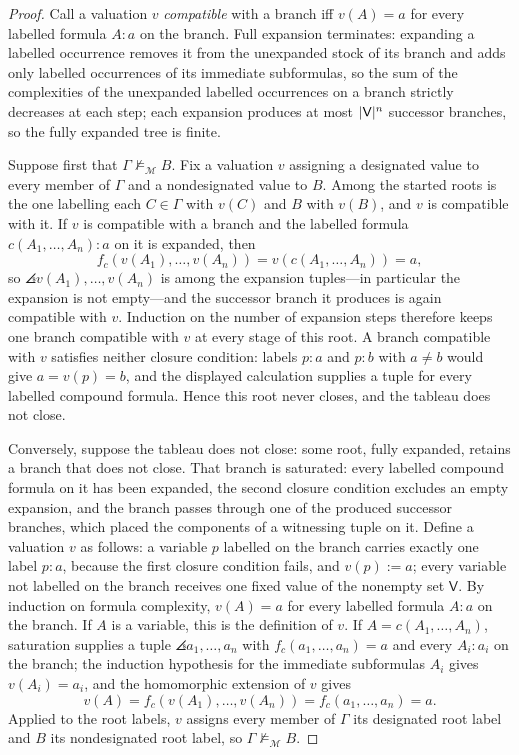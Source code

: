 \documentclass[11pt,oneside,openany]{book}
\theoremstyle{definition}
\theoremstyle{plain}
\theoremstyle{remark}
\DeclarePairedDelimiter{\angles}{\langle}{\rangle}
\DeclarePairedDelimiter{\abs}{\lvert}{\rvert}
\newcommand{\notentails}{\not\models}
\newcommand{\tuple}[1]{\angles{#1}}
\newcommand{\defeq}{\mathrel{:=}}
\begin{document}
\begin{proof}
Call a valuation \(v\) \emph{compatible} with a branch iff \(v(A)=a\) for
every labelled formula \(A{:}a\) on the branch.  Full expansion terminates:
expanding a labelled occurrence removes it from the unexpanded stock of its
branch and adds only labelled occurrences of its immediate subformulas, so
the sum of the complexities of the unexpanded labelled occurrences on a
branch strictly decreases at each step; each expansion produces at most
\(\abs{\mathsf V}^{n}\) successor branches, so the fully expanded tree is
finite.

Suppose first that \(\Gamma\notentails_{\mathcal M}B\).  Fix a valuation
\(v\) assigning a designated value to every member of \(\Gamma\) and a
nondesignated value to \(B\).  Among the started roots is the one labelling
each \(C\in\Gamma\) with \(v(C)\) and \(B\) with \(v(B)\), and \(v\) is
compatible with it.  If \(v\) is compatible with a branch and the labelled
formula \(c(A_1,\ldots,A_n){:}a\) on it is expanded, then
\[
  f_c(v(A_1),\ldots,v(A_n))=v(c(A_1,\ldots,A_n))=a,
\]
so \(\tuple{v(A_1),\ldots,v(A_n)}\) is among the expansion tuples---in
particular the expansion is not empty---and the successor branch it produces
is again compatible with \(v\).  Induction on the number of expansion steps
therefore keeps one branch compatible with \(v\) at every stage of this
root.  A branch compatible with \(v\) satisfies neither closure condition:
labels \(p{:}a\) and \(p{:}b\) with \(a\ne b\) would give \(a=v(p)=b\), and
the displayed calculation supplies a tuple for every labelled compound
formula.  Hence this root never closes, and the tableau does not close.

Conversely, suppose the tableau does not close: some root, fully expanded,
retains a branch that does not close.  That branch is saturated: every
labelled compound formula on it has been expanded, the second closure
condition excludes an empty expansion, and the branch passes through one of
the produced successor branches, which placed the components of a witnessing
tuple on it.  Define a valuation \(v\) as follows: a variable \(p\) labelled
on the branch carries exactly one label \(p{:}a\), because the first closure
condition fails, and \(v(p)\defeq a\); every variable not labelled on the
branch receives one fixed value of the nonempty set \(\mathsf V\).  By
induction on formula complexity, \(v(A)=a\) for every labelled formula
\(A{:}a\) on the branch.  If \(A\) is a variable, this is the definition of
\(v\).  If \(A=c(A_1,\ldots,A_n)\), saturation supplies a tuple
\(\tuple{a_1,\ldots,a_n}\) with \(f_c(a_1,\ldots,a_n)=a\) and every
\(A_i{:}a_i\) on the branch; the induction hypothesis for the immediate
subformulas \(A_i\) gives \(v(A_i)=a_i\), and the homomorphic extension of
\(v\) gives
\[
  v(A)=f_c(v(A_1),\ldots,v(A_n))=f_c(a_1,\ldots,a_n)=a.
\]
Applied to the root labels, \(v\) assigns every member of \(\Gamma\) its
designated root label and \(B\) its nondesignated root label, so
\(\Gamma\notentails_{\mathcal M}B\).
\end{proof}
\end{document}
